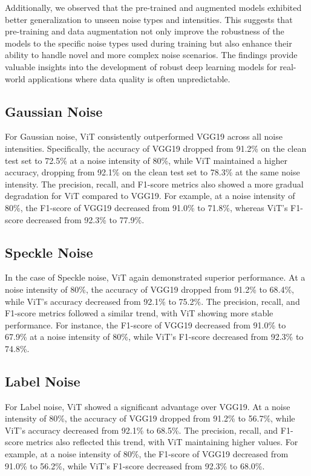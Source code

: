 \documentclass{article}
\begin{document}
Additionally, we observed that the pre-trained and augmented models exhibited better generalization to unseen noise types and intensities. This suggests that pre-training and data augmentation not only improve the robustness of the models to the specific noise types used during training but also enhance their ability to handle novel and more complex noise scenarios. The findings provide valuable insights into the development of robust deep learning models for real-world applications where data quality is often unpredictable.

\subsection{Gaussian Noise}
For Gaussian noise, ViT consistently outperformed VGG19 across all noise intensities. Specifically, the accuracy of VGG19 dropped from 91.2\% on the clean test set to 72.5\% at a noise intensity of 80\%, while ViT maintained a higher accuracy, dropping from 92.1\% on the clean test set to 78.3\% at the same noise intensity. The precision, recall, and F1-score metrics also showed a more gradual degradation for ViT compared to VGG19. For example, at a noise intensity of 80\%, the F1-score of VGG19 decreased from 91.0\% to 71.8\%, whereas ViT's F1-score decreased from 92.3\% to 77.9\%.

\subsection{Speckle Noise}
In the case of Speckle noise, ViT again demonstrated superior performance. At a noise intensity of 80\%, the accuracy of VGG19 dropped from 91.2\% to 68.4\%, while ViT's accuracy decreased from 92.1\% to 75.2\%. The precision, recall, and F1-score metrics followed a similar trend, with ViT showing more stable performance. For instance, the F1-score of VGG19 decreased from 91.0\% to 67.9\% at a noise intensity of 80\%, while ViT's F1-score decreased from 92.3\% to 74.8\%.

\subsection{Label Noise}
For Label noise, ViT showed a significant advantage over VGG19. At a noise intensity of 80\%, the accuracy of VGG19 dropped from 91.2\% to 56.7\%, while ViT's accuracy decreased from 92.1\% to 68.5\%. The precision, recall, and F1-score metrics also reflected this trend, with ViT maintaining higher values. For example, at a noise intensity of 80\%, the F1-score of VGG19 decreased from 91.0\% to 56.2\%, while ViT's F1-score decreased from 92.3\% to 68.0\%.
\end{document}
